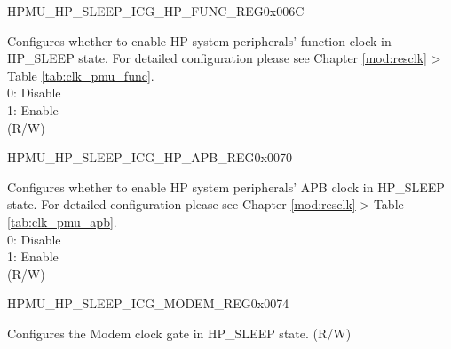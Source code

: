 \begin{register}{H}{PMU\_HP\_SLEEP\_ICG\_HP\_FUNC\_REG}{0x006C}\label{regdesc:PMUHPSLEEPICGHPFUNCREG}
%
\regnewline%
\begin{regdesc}\begin{reglist}
\label{fielddesc:PMUHPSLEEPDIGICGFUNCEN}\item [PMU\_HP\_SLEEP\_DIG\_ICG\_FUNC\_EN] Configures whether to enable HP system peripherals' function clock in HP\_SLEEP state. For detailed configuration please see Chapter \ref{mod:resclk} \textit{} > Table \ref{tab:clk_pmu_func}. \\
0: Disable\\
1: Enable\\
(R/W)
\end{reglist}\end{regdesc}
\end{register}


\begin{register}{H}{PMU\_HP\_SLEEP\_ICG\_HP\_APB\_REG}{0x0070}\label{regdesc:PMUHPSLEEPICGHPAPBREG}
%
\regnewline%
\begin{regdesc}\begin{reglist}
\label{fielddesc:PMUHPSLEEPDIGICGAPBEN}\item [PMU\_HP\_SLEEP\_DIG\_ICG\_APB\_EN] Configures whether to enable HP system peripherals' APB clock in HP\_SLEEP state. For detailed configuration please see Chapter \ref{mod:resclk} \textit{} > Table \ref{tab:clk_pmu_apb}. \\
0: Disable\\
1: Enable\\
(R/W)
\end{reglist}\end{regdesc}
\end{register}


\begin{register}{H}{PMU\_HP\_SLEEP\_ICG\_MODEM\_REG}{0x0074}\label{regdesc:PMUHPSLEEPICGMODEMREG}
%
%
\regnewline%
\begin{regdesc}\begin{reglist}
\label{fielddesc:PMUHPSLEEPDIGICGMODEMCODE}\item [PMU\_HP\_SLEEP\_DIG\_ICG\_MODEM\_CODE] Configures the Modem clock gate in HP\_SLEEP state. (R/W)
\end{reglist}\end{regdesc}
\end{register}



